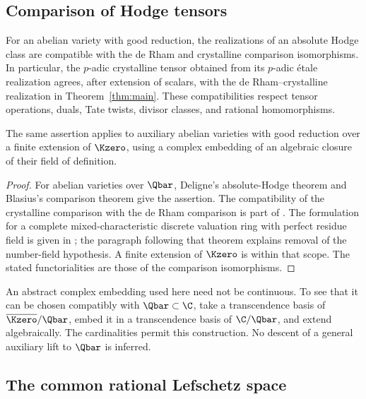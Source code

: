 \subsection{Comparison of Hodge tensors}

\begin{lemma}\label{lem:comparison}
For an abelian variety with good reduction, the realizations of an
absolute Hodge class are compatible with the de Rham and crystalline
comparison isomorphisms. In particular, the \(p\)-adic crystalline tensor
obtained from its \(p\)-adic \'etale realization agrees, after extension of
scalars, with the de Rham--crystalline realization in
Theorem~\ref{thm:main}. These compatibilities respect tensor operations,
duals, Tate twists, divisor classes, and rational homomorphisms.

The same assertion applies to auxiliary abelian varieties with good
reduction over a finite extension of \(\Kzero\), using a complex
embedding of an algebraic closure of their field of definition.
\end{lemma}

\begin{proof}
For abelian varieties over \(\Qbar\), Deligne's absolute-Hodge theorem
\cite[Main Theorem~2.11]{Deligne1982} and Blasius's comparison theorem
\cite[Theorems~0.3 and~5.3]{Blasius1994} give the assertion. The
compatibility of the crystalline comparison with the de Rham comparison
is part of \cite[\S5.1]{Blasius1994}. The formulation for a complete
mixed-characteristic discrete valuation ring with perfect residue field
is given in \cite[Theorem~5.6.3]{Moonen1998}; the paragraph following
that theorem explains removal of the number-field hypothesis. A finite
extension of \(\Kzero\) is within that scope. The stated functorialities
are those of the comparison isomorphisms.
\end{proof}

An abstract complex embedding used here need not be continuous. To see
that it can be chosen compatibly with \(\Qbar\subset\C\), take a
transcendence basis of \(\overline{\Kzero}/\Qbar\), embed it in a
transcendence basis of \(\C/\Qbar\), and extend algebraically. The
cardinalities permit this construction. No descent of a general
auxiliary lift to \(\Qbar\) is inferred.

\subsection{The common rational Lefschetz space}

